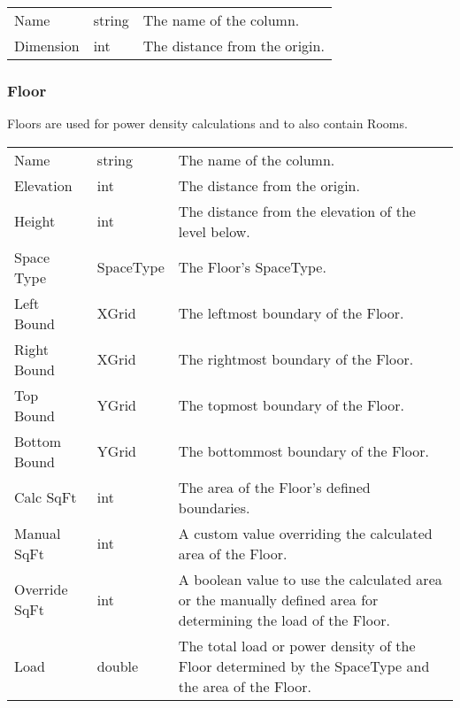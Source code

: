 \documentclass[letterpaper,10pt,english]{sphinxmanual}
\begin{document}
\begin{savenotes}\sphinxattablestart
\centering
\begin{tabulary}{\linewidth}[t]{|T|T|T|}
\hline
\sphinxstyletheadfamily 
{}
&\sphinxstyletheadfamily 
{}
&\sphinxstyletheadfamily 
{}
\\
\hline
Name
&
string
&
The name of the column.
\\
\hline
Dimension
&
int
&
The distance from the origin.
\\
\hline
\end{tabulary}
\par
\sphinxattableend\end{savenotes}


\subsubsection{Floor}
\label{\detokenize{docs/definitions/index-definitions:floor}}\label{\detokenize{docs/definitions/index-definitions:floor-definition}}
Floors are used for power density calculations and to also contain Rooms.


\begin{savenotes}\sphinxattablestart
\centering
\begin{tabulary}{\linewidth}[t]{|T|T|T|}
\hline
\sphinxstyletheadfamily 
{}
&\sphinxstyletheadfamily 
{}
&\sphinxstyletheadfamily 
{}
\\
\hline
Name
&
string
&
The name of the column.
\\
\hline
Elevation
&
int
&
The distance from the origin.
\\
\hline
Height
&
int
&
The distance from the elevation of the level below.
\\
\hline
Space Type
&
SpaceType
&
The Floor’s SpaceType.
\\
\hline
Left Bound
&
XGrid
&
The leftmost boundary of the Floor.
\\
\hline
Right Bound
&
XGrid
&
The rightmost boundary of the Floor.
\\
\hline
Top Bound
&
YGrid
&
The topmost boundary of the Floor.
\\
\hline
Bottom Bound
&
YGrid
&
The bottommost boundary of the Floor.
\\
\hline
Calc SqFt
&
int
&
The area of the Floor’s defined boundaries.
\\
\hline
Manual SqFt
&
int
&
A custom value overriding the calculated area of the Floor.
\\
\hline
Override SqFt
&
int
&
A boolean value to use the calculated area or the manually defined area for determining the load of the Floor.
\\
\hline
Load
&
double
&
The total load or power density of the Floor determined by the SpaceType and the area of the Floor.
\\
\hline
\end{tabulary}
\par
\sphinxattableend\end{savenotes}
\end{document}
